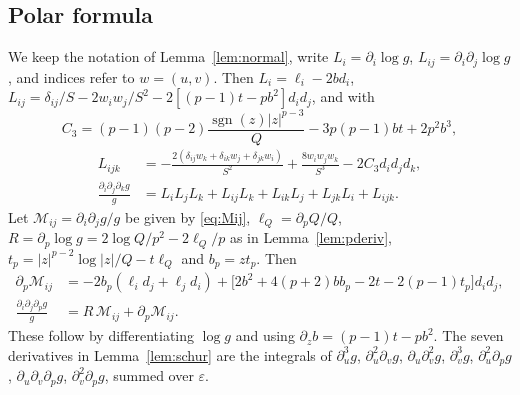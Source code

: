 \documentclass[11pt]{amsart}
\theoremstyle{definition}
\theoremstyle{remark}
\numberwithin{equation}{section}
\newcommand{\sgn}{\operatorname{sgn}}
\newcommand{\ve}{\varepsilon}
\begin{document}
\subsection{Polar formula}
We keep the notation of Lemma~\ref{lem:normal}, write $L_i=\partial_i\log g$, $L_{ij}=\partial_i\partial_j\log g$, and indices refer to $w=(u,v)$. Then $L_i=\ell_i-2bd_i$, $L_{ij}=\delta_{ij}/S-2w_iw_j/S^2-2[(p-1)t-pb^2]d_id_j$, and with
\[
C_3=(p-1)(p-2)\frac{\sgn(z)|z|^{p-3}}{Q}-3p(p-1)bt+2p^2b^3,
\]
\begin{equation}\label{eq:third}
\begin{aligned}
L_{ijk}&=-\frac{2(\delta_{ij}w_k+\delta_{ik}w_j+\delta_{jk}w_i)}{S^2}+\frac{8w_iw_jw_k}{S^3}-2C_3d_id_jd_k,\\
\frac{\partial_i\partial_j\partial_kg}g&=L_iL_jL_k+L_{ij}L_k+L_{ik}L_j+L_{jk}L_i+L_{ijk}.
\end{aligned}
\end{equation}
Let $\mathcal M_{ij}=\partial_i\partial_jg/g$ be given by \eqref{eq:Mij}, $\ell_Q=\partial_pQ/Q$, $R=\partial_p\log g=2\log Q/p^2-2\ell_Q/p$ as in Lemma~\ref{lem:pderiv}, $t_p=|z|^{p-2}\log|z|/Q-t\ell_Q$ and $b_p=zt_p$. Then
\begin{equation}\label{eq:Hp}
\begin{aligned}
\partial_p\mathcal M_{ij}&=-2b_p(\ell_id_j+\ell_jd_i)+\bigl[2b^2+4(p+2)bb_p-2t-2(p-1)t_p\bigr]d_id_j,\\
\frac{\partial_i\partial_j\partial_pg}{g}&=R\,\mathcal M_{ij}+\partial_p\mathcal M_{ij}.
\end{aligned}
\end{equation}
These follow by differentiating $\log g$ and using $\partial_zb=(p-1)t-pb^2$. The seven derivatives in Lemma~\ref{lem:schur} are the integrals of $\partial_u^3g$, $\partial_u^2\partial_vg$, $\partial_u\partial_v^2g$, $\partial_v^3g$, $\partial_u^2\partial_pg$, $\partial_u\partial_v\partial_pg$, $\partial_v^2\partial_pg$, summed over $\ve$.
\end{document}
